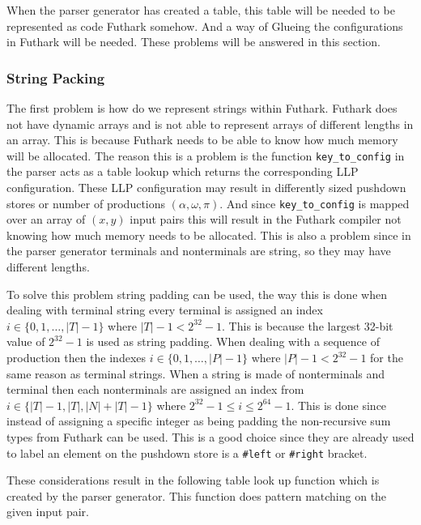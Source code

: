 When the parser generator has created a table, this table will be needed to be represented as code Futhark somehow. And a way of Glueing the configurations in Futhark will be needed. These problems will be answered in this section.
\subsubsection{String Packing}
The first problem is how do we represent strings within Futhark. Futhark does not have dynamic arrays and is not able to represent arrays of different lengths in an array. This is because Futhark needs to be able to know how much memory will be allocated. The reason this is a problem is the function \lstinline|key_to_config| in the parser acts as a table lookup which returns the corresponding LLP configuration. These LLP configuration may result in differently sized pushdown stores or number of productions $(\alpha, \omega, \pi)$. And since \lstinline|key_to_config| is mapped over an array of $(x,y)$ input pairs this will result in the Futhark compiler not knowing how much memory needs to be allocated. This is also a problem since in the parser generator terminals and nonterminals are string, so they may have different lengths.

To solve this problem string padding can be used, the way this is done when dealing with terminal string every terminal is assigned an index $i \in \{0, 1, \dots, |T| - 1\}$ where $|T| - 1 < 2^{32} - 1$. This is because the largest 32-bit value of $2^{32} - 1$ is used as string padding. When dealing with a sequence of production then the indexes $i \in \{0, 1, \dots, |P| - 1\}$ where $|P| - 1 < 2^{32} - 1$ for the same reason as terminal strings. When a string is made of nonterminals and terminal then each nonterminals are assigned an index from $i \in \{|T| - 1, |T|, |N| + |T| - 1\}$ where $2^{32} - 1 \leq i \leq 2^{64} - 1$. This is done since instead of assigning a specific integer as being padding the non-recursive sum types from Futhark can be used. This is a good choice since they are already used to label an element on the pushdown store is a \lstinline|#left| or \lstinline|#right| bracket.

These considerations result in the following table look up function which is created by the parser generator. This function does pattern matching on the given input pair.


